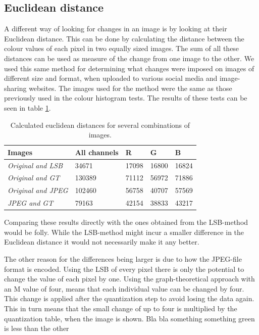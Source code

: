 \subsection{Euclidean distance}
A different way of looking for changes in an image is by looking at their Euclidean distance.
This can be done by calculating the distance between the colour values of each pixel in two equally sized images.
The sum of all these distances can be used as measure of the change from one image to the other.
We used this same method for determining what changes were imposed on images of different size and format, when uploaded to various social media and image-sharing websites.
The images used for the method were the same as those previously used in the colour histogram tests.
The results of these tests can be seen in table \ref {fig:euclidean_distance}.

\begin{table}[]
	\centering
	\begin{tabular}{@{}lllll@{}}
		\toprule
		\textbf{Images}            & \textbf{All channels} & \textbf{R} & \textbf{G} & \textbf{B} \\ \midrule
		\textit{Original and LSB}  & 34671                 & 17098      & 16800      & 16824      \\
		\textit{Original and GT}   & 130389                & 71112      & 56972      & 71886      \\
		\textit{Original and JPEG} & 102460                & 56758      & 40707      & 57569      \\
		\textit{JPEG and GT}       & 79163                 & 42154      & 38833      & 43217     
	\end{tabular}
	\caption{Calculated euclidean distances for several combinations of images.}
	\label{fig:euclidean_distance}
\end{table}


Comparing these results directly with the ones obtained from the LSB-method would be folly.
While the LSB-method might incur a smaller difference in the Euclidean distance it would not necessarily make it any better.

The other reason for the differences being larger is due to how the JPEG-file format is encoded.
Using the LSB of every pixel there is only the potential to change the value of each pixel by one.
Using the graph-theoretical approach with an M value of four, means that each individual value can be changed by four. 
This change is applied after the quantization step to avoid losing the data again.
This in turn means that the small change of up to four is multiplied by the quantization table, when the image is shown.
Bla bla something something green is less than the other

